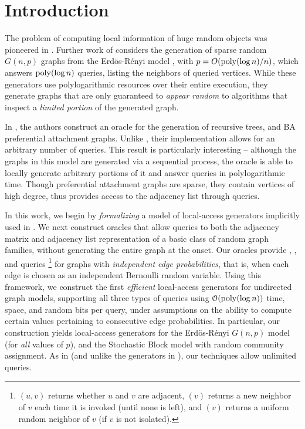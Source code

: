 \section{Introduction}

The problem of computing local information of huge random objects was pioneered in \cite{huge_old,huge}.
Further work of \cite{sparse} considers the generation of sparse random $G(n,p)$ graphs from the Erd\"{o}s-R\'{e}nyi model \cite{er},
with $p = O(\mathrm{poly}(\log n)/n)$, which answers $\mathrm{poly}(\log n)$  queries, listing the neighbors of queried vertices.
While these generators use polylogarithmic resources over their entire execution,
they generate graphs that are  only guaranteed to {\em appear random} to algorithms that inspect a {\em limited portion} of the generated graph.

In \cite{reut}, the authors construct an oracle for the generation of recursive trees, and BA preferential attachment graphs.
Unlike \cite{sparse}, their implementation allows for an arbitrary number of queries.
This result is particularly interesting --  although the graphs in this model are generated via a sequential process,
the oracle is able to locally generate arbitrary portions of it and answer queries in polylogarithmic time.
Though preferential attachment graphs are sparse, they contain vertices of high degree,
thus \cite{reut} provides access to the adjacency list through  queries.

In this work, we begin by \emph{formalizing} a model of local-access generators implicitly used in \cite{reut}.
We next construct oracles that allow queries to both the adjacency matrix and adjacency list representation of a basic class of random graph families,
without generating the entire graph at the onset.
Our oracles provide , , and  queries
\footnote{$(u,v)$ returns whether $u$ and $v$ are adjacent, $(v)$ returns a new neighbor of $v$
each time it is invoked (until none is left), and $(v)$ returns a uniform random neighbor of $v$ (if $v$ is not isolated).}
for graphs with {\em independent edge probabilities}, that is, when each edge is chosen as an independent Bernoulli random variable.
Using this framework, we construct the first \emph{efficient} local-access generators for undirected graph models,
supporting all three types of queries using $\mathcal{O}(\mathrm{poly}(\log n))$ time, space, and random bits per query,
under assumptions on the ability to compute certain values pertaining to consecutive edge probabilities.
In particular, our construction yields local-access generators for the Erd\"{o}s-R\'{e}nyi $G(n,p)$ model (for \emph{all} values of $p$),
and the Stochastic Block model with random community assignment.
As in \cite{reut} (and unlike the generators in \cite{huge_old,huge,sparse}), our techniques allow unlimited queries.

